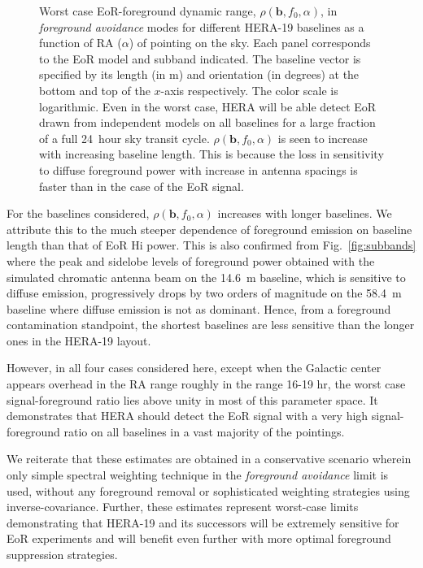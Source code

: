 \documentclass[preprint2,iop,numberedappendix,twocolappendix,appendixfloats]{emulateapj}
\begin{document}
\begin{figure}[htb]
\caption{Worst case EoR-foreground dynamic range, $\rho(\boldsymbol{b},f_0,\alpha)$, in {\it foreground avoidance} modes for different HERA-19 baselines as a function of RA ($\alpha$) of pointing on the sky. Each panel corresponds to the EoR model and subband indicated. The baseline vector is specified by its length (in m) and orientation (in degrees) at the bottom and top of the $x$-axis respectively. The color scale is logarithmic. Even in the worst case, HERA will be able detect EoR drawn from independent models on all baselines for a large fraction of a full 24~hour sky transit cycle. $\rho(\boldsymbol{b},f_0,\alpha)$ is seen to increase with increasing baseline length. This is because the loss in sensitivity to diffuse foreground power with increase in antenna spacings is faster than in the case of the EoR signal.}
\label{fig:eor-fg-ratios}
\end{figure}

For the baselines considered, $\rho(\boldsymbol{b},f_0,\alpha)$ increases with longer baselines. We attribute this to the much steeper dependence of foreground emission on baseline length than that of EoR H{\sc i} power. This is also confirmed from Fig.~\ref{fig:subbands} where the peak and sidelobe levels of foreground power obtained with the simulated chromatic antenna beam on the 14.6~m baseline, which is sensitive to diffuse emission, progressively drops by two orders of magnitude on the 58.4~m baseline where diffuse emission is not as dominant. Hence, from a foreground contamination standpoint, the shortest baselines are less sensitive than the longer ones in the HERA-19 layout.

However, in all four cases considered here, except when the Galactic center appears overhead in the RA range roughly in the range 16-19 hr, the worst case signal-foreground ratio lies above unity in most of this parameter space. It demonstrates that HERA should detect the EoR signal with a very high signal-foreground ratio on all baselines in a vast majority of the pointings. 

We reiterate that these estimates are obtained in a conservative scenario wherein only simple spectral weighting technique in the {\it foreground avoidance} limit is used, without any foreground removal or sophisticated weighting strategies using inverse-covariance. Further, these estimates represent worst-case limits demonstrating that HERA-19 and its successors will be extremely sensitive for EoR experiments and will benefit even further with more optimal foreground suppression strategies.
\end{document}
